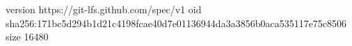 version https://git-lfs.github.com/spec/v1
oid sha256:171bc5d294b1d21c4198fcae40d7e01136944da3a3856b0aca535117e75c8506
size 16480
